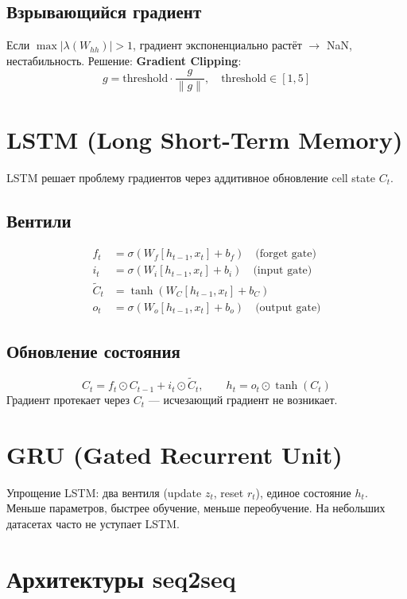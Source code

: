 \documentclass[a4paper,12pt]{article}
\begin{document}
\subsection{Взрывающийся градиент}
Если $\max |\lambda(W_{hh})| > 1$, градиент экспоненциально растёт $\to$ NaN, нестабильность.
Решение: \textbf{Gradient Clipping}:
\[
g = \text{threshold} \cdot \frac{g}{\|g\|}, \quad \text{threshold} \in [1, 5]
\]

\section{LSTM (Long Short-Term Memory)}

LSTM решает проблему градиентов через аддитивное обновление cell state $C_t$.

\subsection{Вентили}
\begin{align*}
f_t &= \sigma(W_f [h_{t-1}, x_t] + b_f) \quad \text{(forget gate)} \\
i_t &= \sigma(W_i [h_{t-1}, x_t] + b_i) \quad \text{(input gate)} \\
\tilde{C}_t &= \tanh(W_C [h_{t-1}, x_t] + b_C) \\
o_t &= \sigma(W_o [h_{t-1}, x_t] + b_o) \quad \text{(output gate)}
\end{align*}

\subsection{Обновление состояния}
\[
C_t = f_t \odot C_{t-1} + i_t \odot \tilde{C}_t, \qquad
h_t = o_t \odot \tanh(C_t)
\]
Градиент протекает через $C_t$ — исчезающий градиент не возникает.

\section{GRU (Gated Recurrent Unit)}

Упрощение LSTM: два вентиля (update $z_t$, reset $r_t$), единое состояние $h_t$. Меньше параметров, быстрее обучение, меньше переобучение. На небольших датасетах часто не уступает LSTM.

\section{Архитектуры seq2seq}
\end{document}
